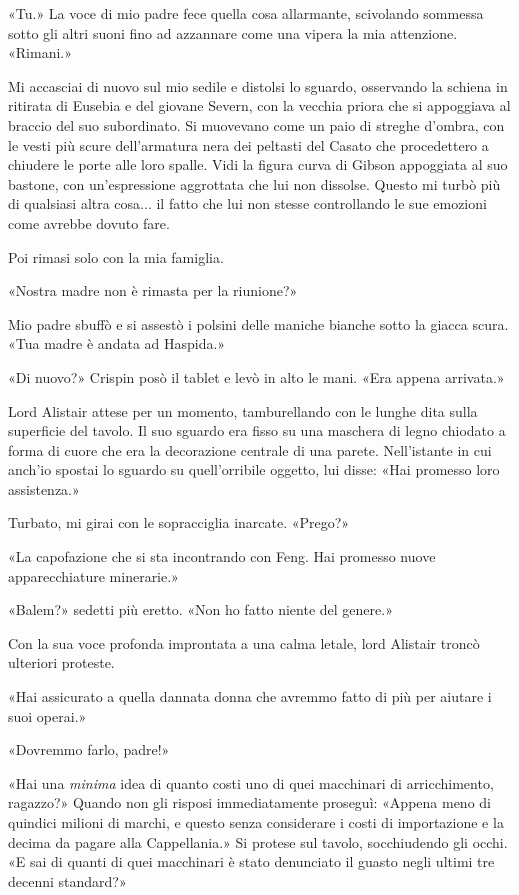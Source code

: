«Tu.» La voce di mio padre fece quella cosa allarmante, scivolando
sommessa sotto gli altri suoni fino ad azzannare come una vipera la mia
attenzione. «Rimani.»

Mi accasciai di nuovo sul mio sedile e distolsi lo sguardo, osservando
la schiena in ritirata di Eusebia e del giovane Severn, con la vecchia
priora che si appoggiava al braccio del suo subordinato. Si muovevano
come un paio di streghe d'ombra, con le vesti più scure dell'armatura
nera dei peltasti del Casato che procedettero a chiudere le porte alle
loro spalle. Vidi la figura curva di Gibson appoggiata al suo bastone,
con un'espressione aggrottata che lui non dissolse. Questo mi turbò più
di qualsiasi altra cosa... il fatto che lui non stesse controllando le
sue emozioni come avrebbe dovuto fare.

Poi rimasi solo con la mia famiglia.

«Nostra madre non è rimasta per la riunione?»

Mio padre sbuffò e si assestò i polsini delle maniche bianche sotto la
giacca scura. «Tua madre è andata ad Haspida.»

«Di nuovo?» Crispin posò il tablet e levò in alto le mani. «Era appena
arrivata.»

Lord Alistair attese per un momento, tamburellando con le lunghe dita
sulla superficie del tavolo. Il suo sguardo era fisso su una maschera di
legno chiodato a forma di cuore che era la decorazione centrale di una
parete. Nell'istante in cui anch'io spostai lo sguardo su quell'orribile
oggetto, lui disse: «Hai promesso loro assistenza.»

Turbato, mi girai con le sopracciglia inarcate. «Prego?»

«La capofazione che si sta incontrando con Feng. Hai promesso nuove
apparecchiature minerarie.»

«Balem?» sedetti più eretto. «Non ho fatto niente del genere.»

Con la sua voce profonda improntata a una calma letale, lord Alistair
troncò ulteriori proteste.

«Hai assicurato a quella dannata donna che avremmo fatto di più per
aiutare i suoi operai.»

«Dovremmo farlo, padre!»

«Hai una \emph{minima} idea di quanto costi uno di quei macchinari di
arricchimento, ragazzo?» Quando non gli risposi immediatamente proseguì:
«Appena meno di quindici milioni di marchi, e questo senza considerare i
costi di importazione e la decima da pagare alla Cappellania.» Si
protese sul tavolo, socchiudendo gli occhi. «E sai di quanti di quei
macchinari è stato denunciato il guasto negli ultimi tre decenni
standard?»

